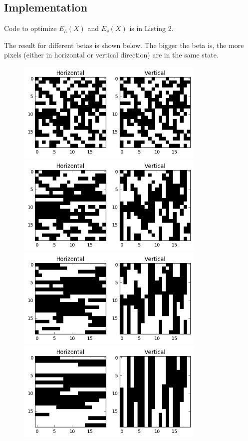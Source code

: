 \documentclass[12pt,a4paper]{scrartcl}
\begin{document}
\subsection{Implementation}
Code to optimize \(E_{h}(X)\) and \(E_{v}(X)\) is in Listing 2.


The result for different betas is shown below.
The bigger the beta is, the more pixels (either in horizontal or vertical direction) are in the same state.

\begin{figure}
	\centering
    \includegraphics[width=9cm]{result2.png}

    \includegraphics[width=9cm]{result3.png}

    \includegraphics[width=9cm]{result4.png}

    \includegraphics[width=9cm]{result5.png}


\end{figure}
\end{document}
